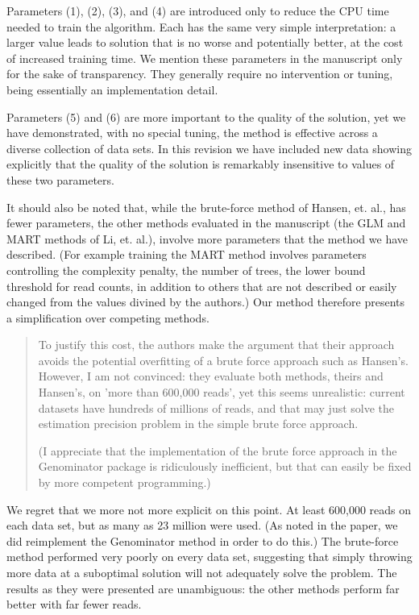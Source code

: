 \documentclass{article}
\begin{document}
Parameters (1), (2), (3), and (4) are introduced only to reduce the CPU time
needed to train the algorithm. Each has the same very simple interpretation: a
larger value leads to solution that is no worse and potentially better, at the
cost of increased training time.  We mention these parameters in the manuscript
only for the sake of transparency.  They generally require no intervention or
tuning, being essentially an implementation detail. 

Parameters (5) and (6) are more important to the quality of the solution, yet we
have demonstrated, with no special tuning, the method is effective across a
diverse collection of data sets. In this revision we have included new data
showing explicitly that the quality of the solution is remarkably insensitive to
values of these two parameters.

It should also be noted that, while the brute-force method of Hansen, et. al.,
has fewer parameters, the other methods evaluated in the manuscript (the GLM and
MART methods of Li, et. al.), involve more parameters that the method we
have described. (For example training the MART method involves parameters
controlling the complexity penalty, the number of trees, the lower bound
threshold for read counts, in addition to others that are not described or
easily changed from the values divined by the authors.) Our method therefore
presents a simplification over competing methods.


\begin{quote}
To justify this cost, the
authors make the argument that their approach avoids the potential
overfitting of a brute force approach such as Hansen's. However, I am
not convinced: they evaluate both methods, theirs and Hansen's, on
'more than 600,000 reads', yet this seems unrealistic: current
datasets have hundreds of millions of reads, and that may just solve
the estimation precision problem in the simple brute force approach.

(I appreciate that the implementation of the brute force approach in
the Genominator package is ridiculously inefficient, but that can
easily be fixed by more competent programming.)
\end{quote}

We regret that we more not more explicit on this point. At least 600,000 reads
on each data set, but as many as 23 million were used. (As noted in the paper,
we did reimplement the Genominator method in order to do this.) The brute-force
method performed very poorly on every data set, suggesting that simply throwing
more data at a suboptimal solution will not adequately solve the problem. The
results as they were presented are unambiguous: the other methods perform far
better with far fewer reads.
\end{document}
